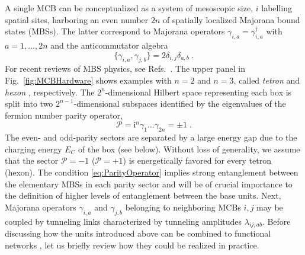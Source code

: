 \documentclass[twocolumn,floats,prx,showpacs]{revtex4-1}
\begin{document}
A single MCB can be conceptualized as a system of mesoscopic size, $i$ labelling spatial sites, 
harboring an even number $2n$ of spatially localized Majorana bound states (MBSs). The latter correspond to 
Majorana operators $\gamma_{i,a}=\gamma^\dagger_{i,a}$ with $a=1,\dots,2n$ and  the anticommutator algebra 
\begin{equation}
\{ \gamma_{i,a},\gamma_{j,b}\}=2\delta_{i,j}\delta_{a,b}\; . 
\end{equation}
For recent reviews of MBS physics, see Refs.~\cite{Alicea2012,Leijnse2012,Beenakker2013,Sarma2015,Aguado2017,Lutchyn2018}.  
The upper panel in Fig.~\ref{fig:MCBHardware} shows examples with $n=2$ and $n=3$, called \emph{tetron} and \emph{hexon} \cite{Karzig2017}, respectively.   The $2^n$-dimensional Hilbert space representing each box is split into two $2^{n-1}$-dimensional subspaces identified by the eigenvalues of the fermion number parity operator,
\begin{equation}
\label{eq:ParityOperator}
\mathcal P =  \mathrm i ^n\gamma_1 \ldots \gamma_{2n}=\pm 1\;.
\end{equation}
The even- and odd-parity sectors are separated by a large energy gap due to the charging energy $E_C$ of the box (see below).  Without loss of generality, we assume that the sector $\mathcal{P}=-1$ ($\mathcal P=+1$) is energetically favored for every tetron (hexon). The condition \eqref{eq:ParityOperator} implies strong entanglement between the elementary MBSs in each parity sector and will be of crucial importance to the definition of higher levels of entanglement between the base units. Next, Majorana operators $\gamma_{i,a}$ and $\gamma_{j,b}$ belonging to neighboring MCBs $i,j$ may be coupled by tunneling links characterized by tunneling amplitudes $\lambda_{ij,ab}$. 
Before discussing how the units introduced above can be combined to functional networks   \cite{PhysRevB.94.174514,Xu2010,PhysRevLett.108.260504,Roy2017,Nussinov2012,Vijay2015,Vijay2016,Litinski2017}, 
let us briefly review how they could be realized in practice.
\end{document}
